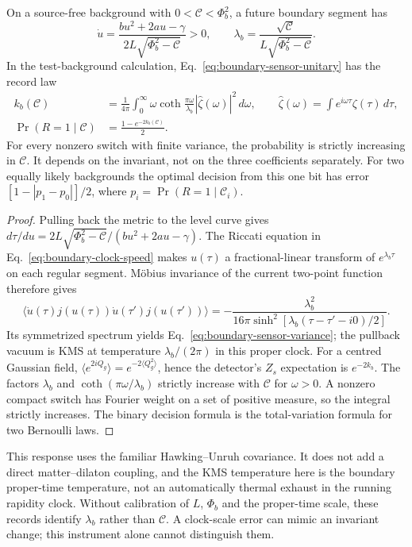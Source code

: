 \begin{proposition}
\label{prop:boundary-sensor-law}
On a source-free background with $0<\mathcal C<\Phi_b^2$, a future boundary
segment has
\begin{equation}\label{eq:boundary-clock-speed}
 \dot u=\frac{bu^2+2au-\gamma}{2L\sqrt{\Phi_b^2-\mathcal C}}>0,
 \qquad
 \lambda_b=\frac{\sqrt{\mathcal C}}{L\sqrt{\Phi_b^2-\mathcal C}}.
\end{equation}
In the test-background calculation, Eq.~\eqref{eq:boundary-sensor-unitary}
has the record law
\begin{align}
 k_b(\mathcal C)&=\frac{1}{4\pi}\int_0^\infty
  \omega\coth\frac{\pi\omega}{\lambda_b}
  |\widehat\zeta(\omega)|^2\,d\omega,
 \qquad \widehat\zeta(\omega)=\int e^{i\omega\tau}\zeta(\tau)\,d\tau,
 \label{eq:boundary-sensor-variance}\\
 \Pr(R=1\mid\mathcal C)&=\frac{1-e^{-2k_b(\mathcal C)}}2.
 \label{eq:boundary-sensor-record}
\end{align}
For every nonzero switch with finite variance, the probability is strictly
increasing in $\mathcal C$. It depends on the invariant, not on the three
coefficients separately. For two equally likely backgrounds the optimal
decision from this one bit has error
$[1-|p_1-p_0|]/2$, where $p_i=\Pr(R=1\mid\mathcal C_i)$.
\end{proposition}
\begin{proof}
Pulling back the metric to the level curve gives
$d\tau/du=2L\sqrt{\Phi_b^2-\mathcal C}/(bu^2+2au-\gamma)$.
The Riccati equation in Eq.~\eqref{eq:boundary-clock-speed} makes $u(\tau)$
a fractional-linear transform of $e^{\lambda_b\tau}$ on each regular segment.
M\"obius invariance of the current two-point function therefore gives
\[
 \langle\dot u(\tau)j(u(\tau))\dot u(\tau')j(u(\tau'))\rangle
 =-\frac{\lambda_b^2}{16\pi
       \sinh^2[\lambda_b(\tau-\tau'-i0)/2]}.
\]
Its symmetrized spectrum yields Eq.~\eqref{eq:boundary-sensor-variance}; the
pullback vacuum is KMS at temperature $\lambda_b/(2\pi)$ in this proper clock.
For a centred Gaussian field,
$\langle e^{2iQ_g}\rangle=e^{-2\langle Q_g^2\rangle}$, hence the detector's
$Z_s$ expectation is $e^{-2k_b}$. The factors $\lambda_b$ and
$\coth(\pi\omega/\lambda_b)$ strictly increase with $\mathcal C$ for
$\omega>0$. A nonzero compact switch has Fourier weight on a set of positive
measure, so the integral strictly increases. The binary decision formula is
the total-variation formula for two Bernoulli laws.
\end{proof}
This response uses the familiar Hawking--Unruh covariance. It does not add a
direct matter--dilaton coupling, and the KMS temperature here is the boundary
proper-time temperature, not an automatically thermal exhaust in the running
rapidity clock.
Without calibration of $L$, $\Phi_b$ and the proper-time scale, these records
identify $\lambda_b$ rather than $\mathcal C$. A clock-scale error can mimic
an invariant change; this instrument alone cannot distinguish them.

